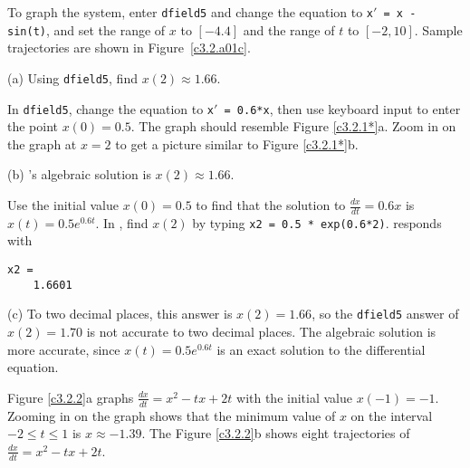 To graph the system, enter {\tt dfield5} and change the equation to
{\tt x$'$ = x - sin(t)}, and set the range of $x$ to $[-4.4]$ and the
range of $t$ to $[-2,10]$.  Sample trajectories are shown in
Figure~\ref{c3.2.a01c}.

\begin{figure}[htb]
                       \centerline{%
                       }
\end{figure}

(a) \ans Using {\tt dfield5}, find $x(2) \approx 1.66$.

\soln In {\tt dfield5}, change the equation to {\tt x$'$ = 0.6*x}, then
use keyboard input to enter the point $x(0) = 0.5$.  The graph should
resemble Figure \ref{c3.2.1*}a.  Zoom in on the graph at $x = 2$ to get a
picture similar to Figure \ref{c3.2.1*}b.

(b) \ans \Matlabp's algebraic solution is $x(2) \approx 1.66$.

\soln Use the initial value $x(0) = 0.5$ to find that the solution to
$\frac{dx}{dt} = 0.6x$ is $x(t) = 0.5e^{0.6t}$.  In \Matlabp, find $x(2)$
by typing {\tt x2 = 0.5 * exp(0.6*2)}.
\Matlab responds with
\begin{verbatim}
x2 =
    1.6601
\end{verbatim}

(c) To two decimal places, this answer is $x(2) = 1.66$, so the
{\tt dfield5} answer of $x(2) = 1.70$ is not accurate to two decimal
places.  The algebraic solution is more accurate, since $x(t) = 0.5e^{0.6t}$
is an exact solution to the differential equation.

\begin{figure}[htb]
                       \centerline{%
                       }
\end{figure}

Figure \ref{c3.2.2}a graphs $\frac{dx}{dt} = x^2 -tx +2t$ with the
initial value $x(-1) = -1$.  Zooming in on the graph shows that the
minimum value of $x$ on the interval $-2 \leq t \leq 1$ is $x \approx
-1.39$.  The Figure \ref{c3.2.2}b shows eight trajectories of
$\frac{dx}{dt} = x^2 -tx +2t$.

\begin{figure}[htb]
                       \centerline{%
                       }
\end{figure}

